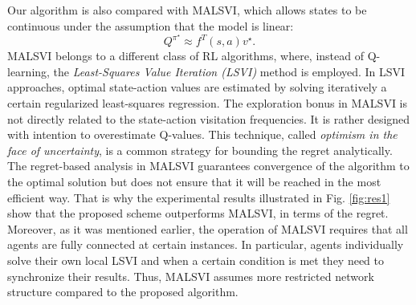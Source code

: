 \documentclass[lettersize,journal]{IEEEtran}
\begin{document}
 Our algorithm is also compared with MALSVI, which allows states to be continuous under the assumption that the model is linear: $$Q^{\pi^{\star}}\approx f^T(s,a) v^{\star}.$$ MALSVI belongs to a different class of RL algorithms, where, instead of Q-learning, the \textit{Least-Squares Value Iteration (LSVI)} method is employed. In LSVI approaches, optimal state-action values are estimated by solving iteratively a certain regularized least-squares regression. The exploration bonus in MALSVI is not directly related to the state-action visitation frequencies. It is rather designed with intention to overestimate Q-values.  This technique, called \textit{optimism in the face of uncertainty}, is a common strategy for bounding the regret analytically. The regret-based analysis in MALSVI guarantees convergence of the algorithm to the optimal solution but does not ensure that it will be reached in the most efficient way.  That is why the experimental results illustrated in Fig. \ref{fig:res1} show that the proposed scheme outperforms MALSVI, in terms of the regret. Moreover, as it was mentioned earlier, the operation of MALSVI requires that all agents are fully connected at certain instances. In particular,  agents individually solve their own local LSVI and when a certain condition is met  they need to synchronize their results. Thus, MALSVI assumes more restricted network structure compared to the proposed algorithm. 
 
 

\end{document}
